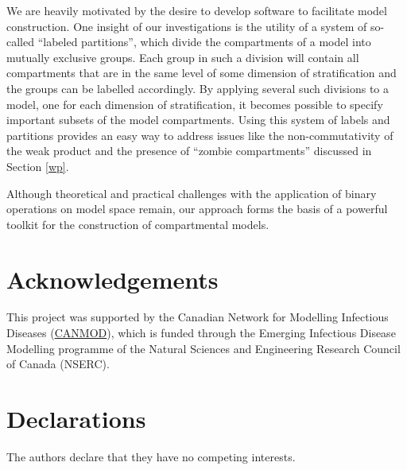 \documentclass{article}
\theoremstyle{definition}
\begin{document}
We are heavily motivated by the desire to develop software to facilitate model construction. One insight of our investigations is the utility of a system of so-called ``labeled partitions'', which divide the compartments of a model into mutually exclusive groups. Each group in such a division will contain all compartments that are in the same level of some dimension of stratification and the groups can be labelled accordingly. By applying several such divisions to a model, one for each dimension of stratification, it becomes possible to specify important subsets of the model compartments. Using this system of labels and partitions provides an easy way to address issues like the non-commutativity of the weak product and the presence of ``zombie compartments'' discussed in Section \ref{wp}.

Although theoretical and practical challenges with the application of binary operations on model space remain, our approach forms the basis of a powerful toolkit for the construction of compartmental models.


\section{Acknowledgements}

This project was supported by the Canadian Network for Modelling Infectious Diseases (\href{https://canmod.net/}{CANMOD}), which is funded through the Emerging Infectious Disease Modelling programme of the Natural Sciences and Engineering Research Council of Canada (NSERC).

\section{Declarations}

The authors declare that they have no competing interests.
\end{document}
